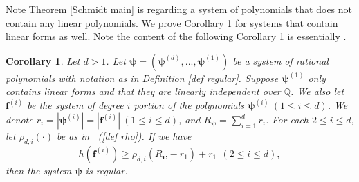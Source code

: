 \documentclass[12pt]{amsart}
\newtheorem{cor}[thm]{Corollary}
\theoremstyle{definition}
\theoremstyle{remark}
\numberwithin{equation}{section}
\begin{document}
Note Theorem \ref{Schmidt main} is regarding a system of polynomials that does not contain any linear polynomials.
We prove Corollary \ref{cor Schmidt} for systems that contain linear forms as well.
Note the content of the following Corollary \ref{cor Schmidt} is essentially \cite[Corollary 3]{CM}.
\begin{cor}
\label{cor Schmidt}
Let $d>1$. Let $\boldsymbol{\psi} = (\boldsymbol{\psi}^{(d)}, ..., \boldsymbol{\psi}^{(1)})$ be a system of rational polynomials with notation as in Definition \ref{def regular}.
Suppose $\boldsymbol{\psi}^{(1)}$ only contains linear forms and that they are linearly independent over $\mathbb{Q}$.
We also let $\mathbf{f}^{(i)}$ be the system of degree $i$ portion of the polynomials $\boldsymbol{\psi}^{(i)} \ (1 \leq i \leq d)$.
We denote $r_i = | \boldsymbol{\psi}^{(i)} | = | \mathbf{f}^{(i)} | \ (1 \leq i \leq d)$, and $R_{\boldsymbol{\psi} }  = \sum_{i=1}^d r_i$.
For each $2 \leq i \leq d$, let $\rho_{d,i}(\cdot)$ be as in ~(\ref{def rho}).
If we have
$$
h(  \mathbf{f}^{(i)} ) \geq \rho_{d,i} (R_{\boldsymbol{\psi} }  - r_1) + r_1 \ \ (2 \leq i \leq d),
$$
then the system $\boldsymbol{\psi}$ is regular.
\end{cor}
\end{document}
